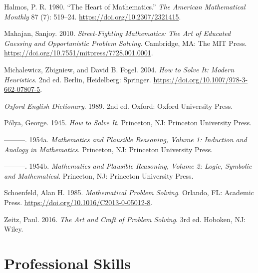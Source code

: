 \documentclass[
  a4paper,
  DIV=11,
  numbers=noendperiod,
  oneside]{scrreprt}
\newlength{\cslhangindent}
\newenvironment{CSLReferences}[2] %
 {\begin{list}{}{%
  \setlength{\itemindent}{0pt}
  \setlength{\leftmargin}{0pt}
  \setlength{\parsep}{0pt}
  \ifodd #1
   \setlength{\leftmargin}{\cslhangindent}
   \setlength{\itemindent}{-1\cslhangindent}
  \fi
  \setlength{\itemsep}{#2\baselineskip}}}
 {\end{list}}
\begin{document}
\label{refs}
\begin{CSLReferences}{1}{0}
Halmos, P. R. 1980. {``The Heart of Mathematics.''} \emph{The American
Mathematical Monthly} 87 (7): 519--24.
\url{https://doi.org/10.2307/2321415}.

Mahajan, Sanjoy. 2010. \emph{Street-Fighting Mathematics: The Art of
Educated Guessing and Opportunistic Problem Solving}. Cambridge, MA: The
MIT Press. \url{https://doi.org/10.7551/mitpress/7728.001.0001}.

Michalewicz, Zbigniew, and David B. Fogel. 2004. \emph{{How to Solve It:
Modern Heuristics}}. 2nd ed. Berlin, Heidelberg: Springer.
\url{https://doi.org/10.1007/978-3-662-07807-5}.

\emph{Oxford English Dictionary}. 1989. 2nd ed. Oxford: Oxford
University Press.

Pólya, George. 1945. \emph{{How to Solve It}}. Princeton, NJ: Princeton
University Press.

---------. 1954a. \emph{Mathematics and Plausible Reasoning, Volume 1:
Induction and Analogy in Mathematics}. Princeton, NJ: Princeton
University Press.

---------. 1954b. \emph{Mathematics and Plausible Reasoning, Volume 2:
Logic, Symbolic and Mathematical}. Princeton, NJ: Princeton University
Press.

Schoenfeld, Alan H. 1985. \emph{Mathematical Problem Solving}. Orlando,
FL: Academic Press. \url{https://doi.org/10.1016/C2013-0-05012-8}.

Zeitz, Paul. 2016. \emph{The Art and Craft of Problem Solving}. 3rd ed.
Hoboken, NJ: Wiley.

\end{CSLReferences}

\endgroup

\part{Professional Skills}
\end{document}
